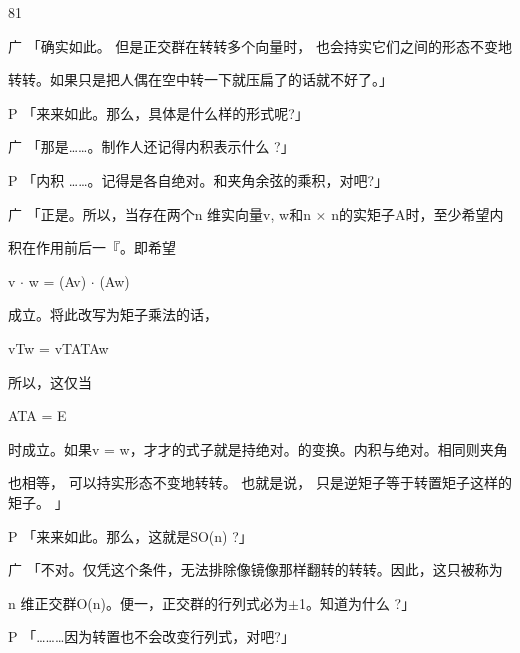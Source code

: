 81\par
广 「确实如此。 但是正交群在转转多个向量时， 也会持实它们之间的形态不变地\par
转转。如果只是把人偶在空中转一下就压扁了的话就不好了。」\par
P 「来来如此。那么，具体是什么样的形式呢?」\par
广 「那是……。制作人还记得内积表示什么 ?」\par
P 「内积 ……。记得是各自绝对。和夹角余弦的乘积，对吧?」\par
广 「正是。所以，当存在两个n 维实向量v, w和n $\times$ n的实矩子A时，至少希望内\par
积在作用前后一『。即希望\par
v $\cdot$ w = (Av) $\cdot$ (Aw)\par
成立。将此改写为矩子乘法的话，\par
vTw = vTATAw\par
所以，这仅当\par
ATA = E\par
时成立。如果v = w，才才的式子就是持绝对。的变换。内积与绝对。相同则夹角\par
也相等， 可以持实形态不变地转转。 也就是说， 只是逆矩子等于转置矩子这样的矩子。 」\par
P 「来来如此。那么，这就是SO(n) ?」\par
广 「不对。仅凭这个条件，无法排除像镜像那样翻转的转转。因此，这只被称为\par
n 维正交群O(n)。便一，正交群的行列式必为$\pm$1。知道为什么 ?」\par
P 「………因为转置也不会改变行列式，对吧?」\par

